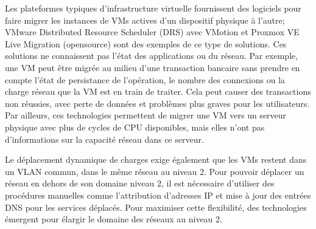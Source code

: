 Les plateformes typiques d'infrastructure virtuelle fournissent des logiciels pour faire migrer les instances de VMs actives d'un dispositif physique à l'autre; VMware Distributed Resource Scheduler (DRS) avec VMotion et Proxmox VE Live Migration (\gls{opensource}) sont des exemples de ce type de solutions. Ces solutions ne connaissent pas l'état des applications ou du réseau. Par exemple, une VM peut être migrée au milieu d'une transaction bancaire sans prendre en compte l'état de persistance de l'opération, le nombre des connexions ou la charge réseau que la VM est en train de traiter. Cela peut causer des transactions non réussies, avec perte de données et problèmes plus graves pour les utilisateurs. Par ailleurs, ces technologies permettent de migrer une VM vers un serveur physique avec plus de cycles de CPU disponibles, mais elles n'ont pas d'informations sur la capacité réseau dans ce serveur.  



Le déplacement dynamique de charges exige également que les VMs restent dans un VLAN commun, dans le même réseau au niveau 2.  Pour pouvoir déplacer un réseau en dehors de son domaine niveau 2, il est nécessaire d'utiliser des procédures manuelles comme l'attribution d'adresses IP et mise à jour des entrées DNS pour les services déplacés. Pour maximiser cette flexibilité, des technologies émergent pour élargir le domaine des réseaux au niveau 2.

